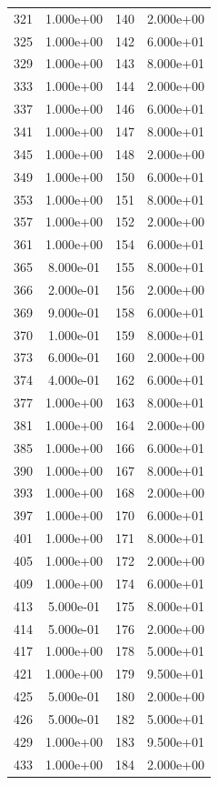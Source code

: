 \documentclass[12pt]{article}
\begin{document}
\begin{longtable}{@{}cccc@{}}
321 & 1.000e+00 & 140 & 2.000e+00 \\
325 & 1.000e+00 & 142 & 6.000e+01 \\
329 & 1.000e+00 & 143 & 8.000e+01 \\
333 & 1.000e+00 & 144 & 2.000e+00 \\
337 & 1.000e+00 & 146 & 6.000e+01 \\
341 & 1.000e+00 & 147 & 8.000e+01 \\
345 & 1.000e+00 & 148 & 2.000e+00 \\
349 & 1.000e+00 & 150 & 6.000e+01 \\
353 & 1.000e+00 & 151 & 8.000e+01 \\
357 & 1.000e+00 & 152 & 2.000e+00 \\
361 & 1.000e+00 & 154 & 6.000e+01 \\
365 & 8.000e-01 & 155 & 8.000e+01 \\
366 & 2.000e-01 & 156 & 2.000e+00 \\
369 & 9.000e-01 & 158 & 6.000e+01 \\
370 & 1.000e-01 & 159 & 8.000e+01 \\
373 & 6.000e-01 & 160 & 2.000e+00 \\
374 & 4.000e-01 & 162 & 6.000e+01 \\
377 & 1.000e+00 & 163 & 8.000e+01 \\
381 & 1.000e+00 & 164 & 2.000e+00 \\
385 & 1.000e+00 & 166 & 6.000e+01 \\
390 & 1.000e+00 & 167 & 8.000e+01 \\
393 & 1.000e+00 & 168 & 2.000e+00 \\
397 & 1.000e+00 & 170 & 6.000e+01 \\
401 & 1.000e+00 & 171 & 8.000e+01 \\
405 & 1.000e+00 & 172 & 2.000e+00 \\
409 & 1.000e+00 & 174 & 6.000e+01 \\
413 & 5.000e-01 & 175 & 8.000e+01 \\
414 & 5.000e-01 & 176 & 2.000e+00 \\
417 & 1.000e+00 & 178 & 5.000e+01 \\
421 & 1.000e+00 & 179 & 9.500e+01 \\
425 & 5.000e-01 & 180 & 2.000e+00 \\
426 & 5.000e-01 & 182 & 5.000e+01 \\
429 & 1.000e+00 & 183 & 9.500e+01 \\
433 & 1.000e+00 & 184 & 2.000e+00 \\

\end{longtable}
\end{document}
